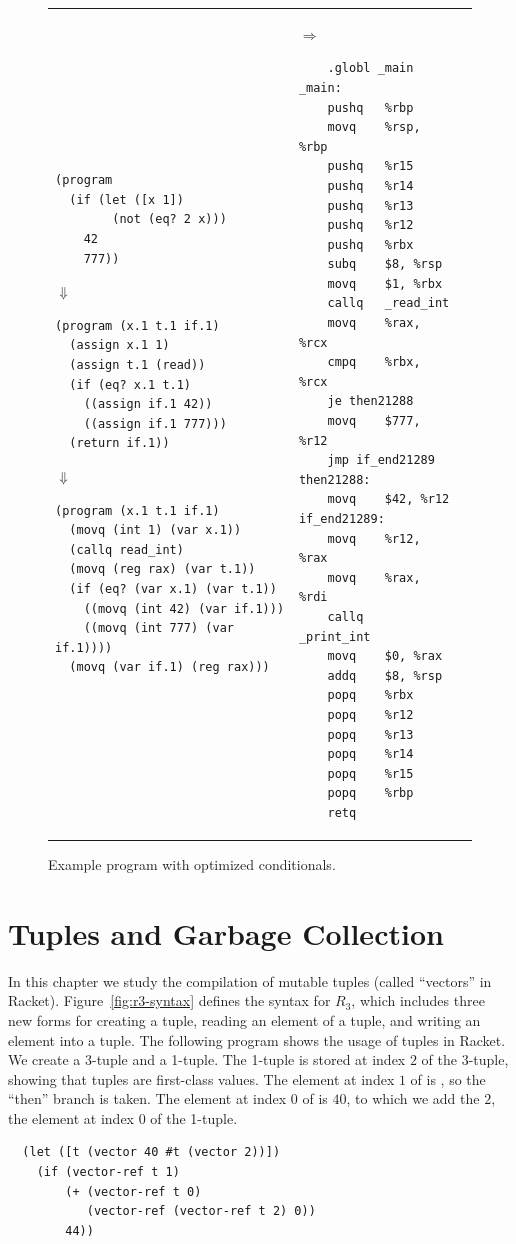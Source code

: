 \documentclass[11pt]{book}
\begin{document}
\begin{figure}[tbp]
\begin{tabular}{lll}
\begin{minipage}{0.5\textwidth}
\begin{lstlisting}
(program
  (if (let ([x 1])
        (not (eq? 2 x)))
    42
    777))
\end{lstlisting}
$\Downarrow$
\begin{lstlisting}
(program (x.1 t.1 if.1)
  (assign x.1 1)
  (assign t.1 (read))
  (if (eq? x.1 t.1)
    ((assign if.1 42))
    ((assign if.1 777)))
  (return if.1))
\end{lstlisting}
$\Downarrow$
\begin{lstlisting}
(program (x.1 t.1 if.1)
  (movq (int 1) (var x.1))
  (callq read_int)
  (movq (reg rax) (var t.1))
  (if (eq? (var x.1) (var t.1))
    ((movq (int 42) (var if.1)))
    ((movq (int 777) (var if.1))))
  (movq (var if.1) (reg rax)))
\end{lstlisting}
\end{minipage}
&
$\Rightarrow$
\begin{minipage}{0.4\textwidth}
\begin{lstlisting}
	.globl _main
_main:
	pushq	%rbp
	movq	%rsp, %rbp
	pushq	%r15
	pushq	%r14
	pushq	%r13
	pushq	%r12
	pushq	%rbx
	subq	$8, %rsp
	movq	$1, %rbx
	callq	_read_int
	movq	%rax, %rcx
	cmpq	%rbx, %rcx
	je then21288
	movq	$777, %r12
	jmp if_end21289
then21288:
	movq	$42, %r12
if_end21289:
	movq	%r12, %rax
	movq	%rax, %rdi
	callq	_print_int
	movq	$0, %rax
	addq	$8, %rsp
	popq	%rbx
	popq	%r12
	popq	%r13
	popq	%r14
	popq	%r15
	popq	%rbp
	retq
\end{lstlisting}
\end{minipage}
\end{tabular} 
\caption{Example program with optimized conditionals.}
\label{fig:opt-if}
\end{figure}


\chapter{Tuples and Garbage Collection}
\label{ch:tuples}

In this chapter we study the compilation of mutable tuples (called
``vectors'' in Racket). Figure~\ref{fig:r3-syntax} defines the syntax
for $R_3$, which includes three new forms for creating a tuple,
reading an element of a tuple, and writing an element into a
tuple. The following program shows the usage of tuples in Racket. We
create a 3-tuple  and a 1-tuple. The 1-tuple is stored at
index $2$ of the 3-tuple, showing that tuples are first-class values.
The element at index $1$ of  is , so the ``then''
branch is taken.  The element at index $0$ of  is $40$, to
which we add the $2$, the element at index $0$ of the 1-tuple.
\begin{lstlisting}
  (let ([t (vector 40 #t (vector 2))])
    (if (vector-ref t 1)
        (+ (vector-ref t 0)
           (vector-ref (vector-ref t 2) 0))
        44))
\end{lstlisting}
\end{document}
